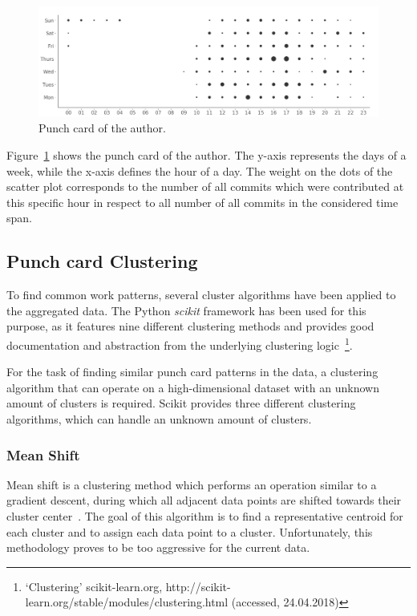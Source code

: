 \begin{figure}[H]
    \includegraphics[scale=0.32]{./graphs/analysis/ordered-punchcard}
    \centering
    \caption{Punch card of the author.}\label{fig:working-hour-rhythm-author}
\end{figure}

Figure~\ref{fig:working-hour-rhythm-author} shows the punch card of the author.
The y-axis represents the days of a week, while the x-axis defines the hour of a day.
The weight on the dots of the scatter plot corresponds to the number of all commits which were contributed at this specific hour in respect to all number of all commits in the considered time span.


\subsection{Punch card Clustering}

To find common work patterns, several cluster algorithms have been applied to the aggregated data.
The Python \emph{scikit} framework has been used for this purpose, as it features nine different clustering methods and provides good documentation and abstraction from the underlying clustering logic~\footnote{`Clustering' scikit-learn.org, http://scikit-learn.org/stable/modules/clustering.html (accessed, 24.04.2018)}.

For the task of finding similar punch card patterns in the data, a clustering algorithm that can operate on a high-dimensional dataset with an unknown amount of clusters is required.
Scikit provides three different clustering algorithms, which can handle an unknown amount of clusters.

\subsubsection{Mean Shift}\label{mean-shift}
Mean shift is a clustering method which performs an operation similar to a gradient descent, during which all adjacent data points are shifted towards their cluster center~\cite{article:mean-shift}.
The goal of this algorithm is to find a representative centroid for each cluster and to assign each data point to a cluster.
Unfortunately, this methodology proves to be too aggressive for the current data.

